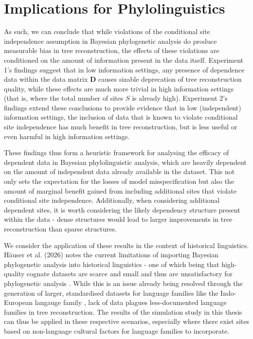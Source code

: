 \section{Implications for Phylolinguistics}
As such, we can conclude that while violations of the conditional site independence assumption in Bayesian phylogenetic analysis do produce measurable bias in tree reconstruction, the effects of these violations are conditioned on the amount of information present in the data itself. Experiment 1's findings suggest that in low information settings, any presence of dependence data within the data matrix $\mathbf{D}$ causes sizable deprecation of tree reconstruction quality, while these effects are much more trivial in high information settings (that is, where the total number of sites $S$ is already high). Experiment 2's findings extend these conclusions to provide evidence that in low (independent) information settings, the inclusion of data that is known to violate conditional site independence has much benefit in tree reconstruction, but is less useful or even harmful in high information settings. 

These findings thus form a heuristic framework for analysing the efficacy of dependent data in Bayesian phylolinguistic analysis, which are heavily dependent on the amount of independent data already available in the dataset. This not only sets the expectation for the losses of model misspecification but also the amount of marginal benefit gained from including additional sites that violate conditional site independence. Additionally, when considering additional dependent sites, it is worth considering the likely dependency structure present within the data - dense structures would lead to larger improvements in tree reconstruction than sparse structures.

We consider the application of these results in the context of historical linguistics. Häuser et al. (2026) notes the current limitations of importing Bayesian phylogenetic analysis into historical linguistics - one of which being that high-quality cognate datasets are scarce and small and thus are unsatisfactory for phylogenetic analysis \cite{Hauser2026}. While this is an issue already being resolved through the generation of larger, standardised datasets for language families like the Indo-European langauge family \cite{Anderson2025}, lack of data plagues less-documented language families in tree reconstruction. The results of the simulation study in this thesis can thus be applied in these respective scenarios, especially where there exist sites based on non-language cultural factors for language families to incorporate.

